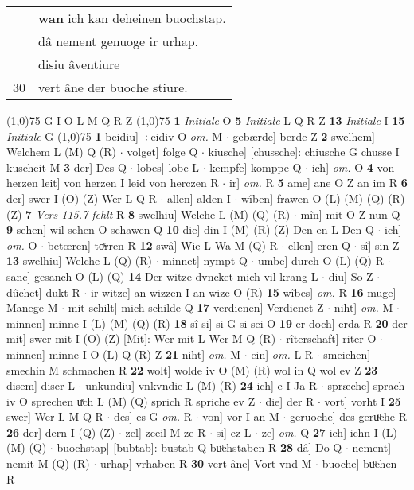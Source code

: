 \documentclass[8pt,a4paper,notitlepage]{article}
\begin{document}
\begin{table}[ht]
\begin{minipage}[t]{0.5\linewidth}
\begin{tabular}{rl}
 & \textbf{wan} ich kan deheinen buochstap.\\ 
 & dâ nement genuoge ir urhap.\\ 
 & disiu âventiure\\ 
30 & vert âne der buoche stiure.\\ 
\end{tabular}
\scriptsize
\line(1,0){75} \newline
G I O L M Q R Z \newline
\line(1,0){75} \newline
\textbf{1} \textit{Initiale} O  \textbf{5} \textit{Initiale} L Q R Z  \textbf{13} \textit{Initiale} I  \textbf{15} \textit{Initiale} G  \newline
\line(1,0){75} \newline
\textbf{1} beidiu] ÷eidiv O \textit{om.} M  $\cdot$ gebærde] berde Z \textbf{2} swelhem] Welchem L (M) Q (R)  $\cdot$ volget] folge Q  $\cdot$ kiusche] [chussche]: chiusche G chusse I kuscheit M \textbf{3} der] Des Q  $\cdot$ lobes] lobe L  $\cdot$ kempfe] komppe Q  $\cdot$ ich] \textit{om.} O \textbf{4} von herzen leit] von herzen I leid von herczen R  $\cdot$ ir] \textit{om.} R \textbf{5} ame] ane O Z an im R \textbf{6} der] swer I (O) (Z) Wer L Q R  $\cdot$ allen] alden I  $\cdot$ wîben] frawen O (L) (M) (Q) (R) (Z) \textbf{7} \textit{Vers 115.7 fehlt} R  \textbf{8} swelhiu] Welche L (M) (Q) (R)  $\cdot$ mîn] mit O Z nun Q \textbf{9} sehen] wil sehen O schawen Q \textbf{10} die] din I (M) (R) (Z) Den en L Den Q  $\cdot$ ich] \textit{om.} O  $\cdot$ betœren] toͯrren R \textbf{12} swâ] Wie L Wa M (Q) R  $\cdot$ ellen] eren Q  $\cdot$ sî] sin Z \textbf{13} swelhiu] Welche L (Q) (R)  $\cdot$ minnet] nympt Q  $\cdot$ umbe] durch O (L) (Q) R  $\cdot$ sanc] gesanch O (L) (Q) \textbf{14} Der witze dvncket mich vil krang L  $\cdot$ diu] So Z  $\cdot$ dûchet] dukt R  $\cdot$ ir witze] an wizzen I an wize O (R) \textbf{15} wîbes] \textit{om.} R \textbf{16} muge] Manege M  $\cdot$ mit schilt] mich schilde Q \textbf{17} verdienen] Verdienet Z  $\cdot$ niht] \textit{om.} M  $\cdot$ minnen] minne I (L) (M) (Q) (R) \textbf{18} sî si] si G si sei O \textbf{19} er doch] erda R \textbf{20} der mit] swer mit I (O) (Z) [Mit]: Wer mit  L Wer M Q (R)  $\cdot$ rîterschaft] riter O  $\cdot$ minnen] minne I O (L) Q (R) Z \textbf{21} niht] \textit{om.} M  $\cdot$ ein] \textit{om.} L R  $\cdot$ smeichen] smechin M schmachen R \textbf{22} wolt] wolde iv O (M) (R) wol in Q wol ev Z \textbf{23} disem] diser L  $\cdot$ unkundiu] vnkvndie L (M) (R) \textbf{24} ich] e I Ja R  $\cdot$ spræche] sprach iv O sprechen uͯch L (M) (Q) sprich R spriche ev Z  $\cdot$ die] der R  $\cdot$ vort] vorht I \textbf{25} swer] Wer L M Q R  $\cdot$ des] es G \textit{om.} R  $\cdot$ von] vor I an M  $\cdot$ geruoche] des geruͦche R \textbf{26} der] dern I (Q) (Z)  $\cdot$ zel] zceil M ze R  $\cdot$ si] ez L  $\cdot$ ze] \textit{om.} Q \textbf{27} ich] ichn I (L) (M) (Q)  $\cdot$ buochstap] [bubtab]: bustab Q buͦchstaben R \textbf{28} dâ] Do Q  $\cdot$ nement] nemit M (Q) (R)  $\cdot$ urhap] vrhaben R \textbf{30} vert âne] Vort vnd M  $\cdot$ buoche] buͦchen R \newline

\end{minipage}
\end{table}
\end{document}

